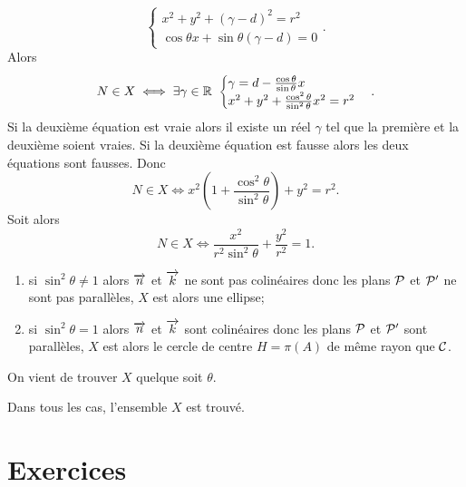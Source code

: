 \begin{enumerate}
\begin{equation}
\begin{cases}
        x^2 + y^2 + (\gamma - d)^2 = r^2\\
        \cos\theta x + \sin\theta (\gamma - d) = 0
      \end{cases}.
    \end{equation}
    Alors
    \begin{equation}
      N \in X \iff \exists \gamma \in \R \
      \begin{cases}
        \gamma = d - \frac{\cos\theta}{\sin\theta}x \\
        x^2 + y^2 + \frac{\cos^2\theta}{\sin^2\theta}x^2 = r^2
      \end{cases}.
    \end{equation}
    Si la deuxième équation est vraie alors il existe un réel \(\gamma\) tel
    que la première et la deuxième soient vraies. Si la deuxième équation
    est fausse alors les deux équations sont fausses. Donc
    \begin{equation}
      N \in X \iff x^2\left(1 + \frac{\cos^2\theta}{\sin^2\theta}\right) +
      y^2 = r^2.
    \end{equation}
    Soit alors
    \begin{equation}
      N \in X \iff \frac{x^2}{r^2\sin^2\theta} + \frac{y^2}{r^2} = 1.
    \end{equation}
    \begin{enumerate}
      \item si \(\sin^2\theta\neq 1\) alors \(\vn\) et \(\vk\) ne sont pas
        colinéaires donc les plans \(\P\) et \(\P'\) ne sont pas parallèles,
        \(X\) est alors une ellipse;
      \item si \(\sin^2\theta = 1\) alors \(\vn\) et \(\vk\) sont
        colinéaires donc les plans \(\P\) et \(\P'\) sont parallèles, \(X\)
        est alors le cercle de centre \(H = \pi(A)\) de même rayon que
        \(\courbe\).
    \end{enumerate}
    On vient de trouver \(X\) quelque soit \(\theta\).
\end{enumerate}
Dans tous les cas, l'ensemble \(X\) est trouvé.

\clearpage

\section{Exercices}

